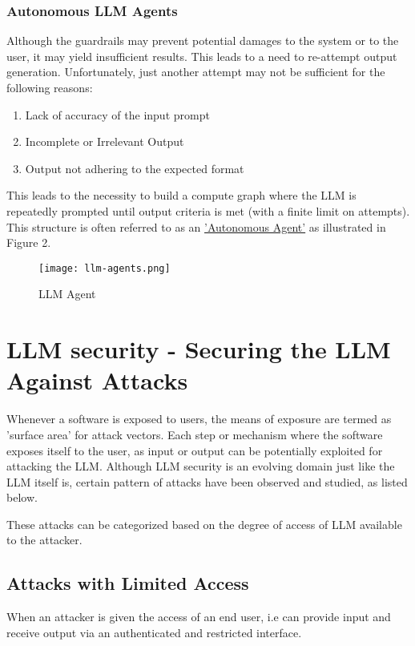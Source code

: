 \documentclass[12pt]{article}
\begin{document}
    \subsubsection{Autonomous LLM Agents}
    Although the guardrails may prevent potential damages to the system or to the user, it may yield insufficient results.
    This leads to a need to re-attempt output generation. Unfortunately, just another attempt may not be sufficient for the following reasons:
    \begin{enumerate}[label=\alph*)]
        \item Lack of accuracy of the input prompt
        \item Incomplete or Irrelevant Output
        \item Output not adhering to the expected format
    \end{enumerate}
    This leads to the necessity to build a compute graph where the LLM is repeatedly prompted until output criteria is met (with a finite limit on attempts). This structure is often referred to as an \href{https://www.promptingguide.ai/research/llm-agents}{'Autonomous Agent'} as illustrated in Figure 2.


    \begin{figure}[h!]
        \centering
        \texttt{[image: llm-agents.png]}
        \caption{LLM Agent}
        \label{fig:enter-label}
    \end{figure}


    \section{LLM security - Securing the LLM Against Attacks}
    Whenever a software is exposed to users, the means of exposure are termed as 'surface area' for attack vectors. Each step or mechanism where the software exposes itself to the user, as input or output can be potentially exploited for attacking the LLM. Although LLM security is an evolving domain just like the LLM itself is, certain pattern of attacks have been observed and studied, as listed below.

    These attacks can be categorized based on the degree of access of LLM available to the attacker.

    \subsection{Attacks with Limited Access}
    When an attacker is given the access of an end user, i.e can provide input and receive output via an authenticated and restricted interface.
\end{document}
